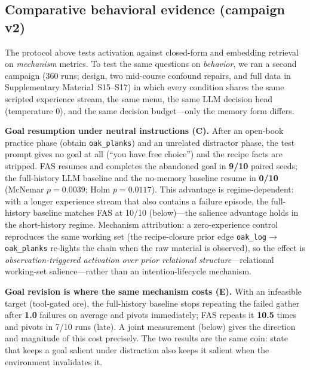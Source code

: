 
\subsection{Comparative behavioral evidence (campaign v2)}
\label{sec:res-campaign}

The protocol above tests activation against closed-form and embedding
retrieval on \emph{mechanism} metrics. To test the same questions on
\emph{behavior}, we ran a second campaign (360 runs; design, two
mid-course confound repairs, and full data in Supplementary
Material~S15--S17) in which every condition shares the same scripted
experience stream, the same menu, the same LLM decision head
(temperature 0), and the same decision budget---only the memory form
differs.

\textbf{Goal resumption under neutral instructions (C).} After an
open-book practice phase (obtain \texttt{oak\_planks}) and an unrelated
distractor phase, the test prompt gives no goal at all
(``you have free choice'') and the recipe facts are stripped. FAS
resumes and completes the abandoned goal in \textbf{9/10} paired seeds;
the full-history LLM baseline and the no-memory baseline resume in
\textbf{0/10} (McNemar $p{=}0.0039$; Holm $p{=}0.0117$). This advantage
is regime-dependent: with a longer experience stream that also contains
a failure episode, the full-history baseline matches FAS at 10/10
(below)---the salience advantage holds in the short-history regime.
Mechanism attribution: a zero-experience control reproduces the
same working set (the recipe-closure prior edge
\texttt{oak\_log}$\rightarrow$\texttt{oak\_planks} re-lights the chain
when the raw material is observed), so the effect is
\emph{observation-triggered activation over prior relational
structure}---relational working-set salience---rather than an
intention-lifecycle mechanism.

\textbf{Goal revision is where the same mechanism costs (E).} With an
infeasible target (tool-gated ore), the full-history baseline stops
repeating the failed gather after \textbf{1.0} failures on average and
pivots immediately; FAS repeats it \textbf{10.5} times and pivots in
7/10 runs (late). A joint measurement (below) gives the direction and
magnitude of this cost precisely. The two results are the same coin: state that keeps
a goal salient under distraction also keeps it salient when the
environment invalidates it.

